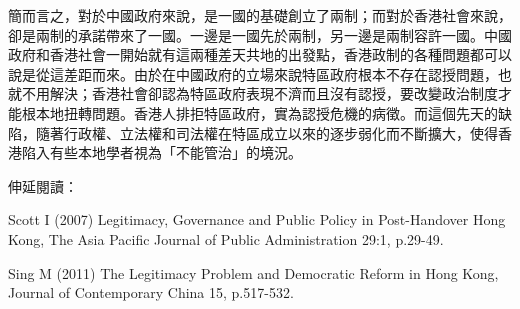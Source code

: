 簡而言之，對於中國政府來說，是一國的基礎創立了兩制；而對於香港社會來說，卻是兩制的承諾帶來了一國。一邊是一國先於兩制，另一邊是兩制容許一國。中國政府和香港社會一開始就有這兩種差天共地的出發點，香港政制的各種問題都可以說是從這差距而來。由於在中國政府的立場來說特區政府根本不存在認授問題，也就不用解決；香港社會卻認為特區政府表現不濟而且沒有認授，要改變政治制度才能根本地扭轉問題。香港人排拒特區政府，實為認授危機的病徵。而這個先天的缺陷，隨著行政權、立法權和司法權在特區成立以來的逐步弱化而不斷擴大，使得香港陷入有些本地學者視為「不能管治」的境況。



伸延閱讀：

Scott I (2007) Legitimacy, Governance and Public Policy in Post-Handover Hong Kong, The Asia Pacific Journal of Public Administration 29:1, p.29-49.

Sing M (2011) The Legitimacy Problem and Democratic Reform in Hong Kong, Journal of Contemporary China 15, p.517-532.